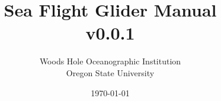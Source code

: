 \title{Sea Flight Glider Manual \\ v0.0.1}
\author{Woods Hole Oceanographic Institution \\ Oregon State University}
\date{\today}
\maketitle
